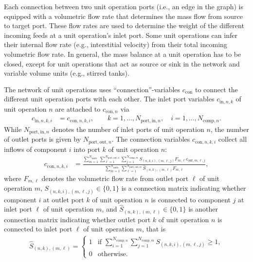 Each connection between two unit operation ports (i.e., an edge in the graph) is equipped with a volumetric flow rate that determines the mass flow from source to target port.
These flow rates are used to determine the weight of the different incoming feeds at a unit operation's inlet port.
Some unit operations can infer their internal flow rate (e.g., interstitial velocity) from their total incoming volumetric flow rate.
In general, the mass balance at a unit operation has to be closed, except for unit operations that act as source or sink in the network and variable volume units (e.g., stirred tanks).

The network of unit operations uses ``connection''-variables $c_{\text{con}}$ to connect the different unit operation ports with each other.
The inlet port variables $c_{\text{in},n,k}$ of unit operation $n$ are attached to $c_{\text{con},n}$ via 
\begin{align}
	c_{\text{in},n,k,i} &= c_{\text{con},n,k,i}, \qquad k = 1, \dots, N_{\text{port},\text{in},n},\quad i = 1, \dots, N_{\text{comp},n}. \label{eq:NetworkInletConnection}
\end{align}
While $N_{\text{port},\text{in},n}$ denotes the number of inlet ports of unit operation $n$, the number of outlet ports is given by $N_{\text{port},\text{out},n}$.
The connection variables $c_{\text{con},n,k,i}$ collect all inflows of component $i$ into port $k$ of unit operation $n$:
\begin{align}
	c_{\text{con},n,k,i} &= \frac{\sum_{m=1}^{N_{\text{units}}} \sum_{\ell = 1}^{N_{\text{port},\text{out},n}} \sum_{j = 1}^{N_{\text{comp},m}} S_{(n,k,i),(m,\ell,j)} F_{m,\ell} c_{\text{out},m,\ell,j}}{\sum_{m=1}^{N_{\text{units}}} \sum_{\ell=1}^{N_{\text{port},\text{out},m}} \hat{S}_{(n,k),(m,\ell)} F_{m,\ell} }, \label{eq:NetworkConnection}
\end{align}
where $F_{m,\ell}$ denotes the volumetric flow rate from outlet port $\ell$ of unit operation $m$, $S_{(n,k,i),(m,\ell,j)} \in \{0, 1\}$ is a connection matrix indicating whether component $i$ at outlet port $k$ of unit operation $n$ is connected to component $j$ at inlet port $\ell$ of unit operation $m$, and $\hat{S}_{(n,k),(m,\ell)} \in \{0, 1\}$ is another connection matrix indicating whether outlet port $k$ of unit operation $n$ is connected to inlet port $\ell$ of unit operation $m$, that is
\begin{align*}
	\hat{S}_{(n,k),(m,\ell)} = \begin{cases}
		1 & \text{if } \sum_{i = 1}^{N_{\text{comp},n}} \sum_{j = 1}^{N_{\text{comp},m}} S_{(n,k,i),(m,\ell,j)} \geq 1, \\
		0 & \text{otherwise}.
	\end{cases}
\end{align*}

